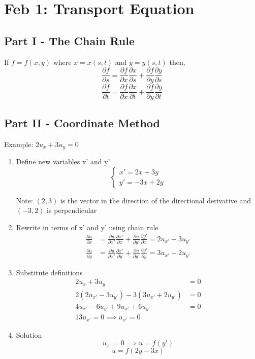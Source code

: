 \documentclass[12pt]{article}
\begin{document}
\section{Feb 1: Transport Equation}
\subsection*{Part I - The Chain Rule}
If $f=f(x, y)$ where $x = x(s, t)$ and $y= y(s, t)$ then, 
\[\frac{\partial f}{\partial s} = \frac{\partial f}{\partial x} \frac{\partial x}{\partial s} + \frac{\partial f}{\partial y} \frac{\partial y}{\partial s}\]
\[\frac{\partial f}{\partial t} = \frac{\partial f}{\partial x} \frac{\partial x}{\partial t} + \frac{\partial f}{\partial y} \frac{\partial y}{\partial t}\]

\subsection*{Part II - Coordinate Method}
Example: $2u_x + 3u_y = 0$

\begin{enumerate}
    \item Define new variables x' and y'
    \[\begin{cases}
        x' = 2x + 3y\\
        y' = -3x + 2y
    \end{cases}\]

    Note: $(2, 3)$ is the vector in the direction of the directional derivative and $(-3, 2)$ is perpendicular

    \item Rewrite in terms of x' and y' using chain rule 
    \begin{align*}
        \frac{\partial u}{\partial x} &= \frac{\partial u}{\partial x'} \frac{\partial x'}{\partial x} + \frac{\partial u}{\partial y'} \frac{\partial y'}{\partial x} = 2u_{x'} - 3u_{y'}\\
        \frac{\partial u}{\partial y} &= \frac{\partial u}{\partial x'} \frac{\partial x'}{\partial y} + \frac{\partial u}{\partial y'} \frac{\partial y'}{\partial y} = 3u_{x'}  + 2u_{y'}
    \end{align*}
    
    \item Substitute definitions
    \begin{align*}
        2u_x + 3u_y &= 0\\
        2(2u_{x'} - 3u_{y'}) - 3(3u_{x'} + 2u_{y'}) &= 0\\
        4u_{x'} - 6u_{y'} + 9u_{x'} + 6u_{y'} &= 0\\
        13u_{x'} = 0 \implies u_{x'} = 0
    \end{align*}

    \item Solution 
    \[u_{x'} = 0 \implies u = f(y')\]
    \[\boxed{u = f(2y-3x)}\]
\end{enumerate}
\end{document}
